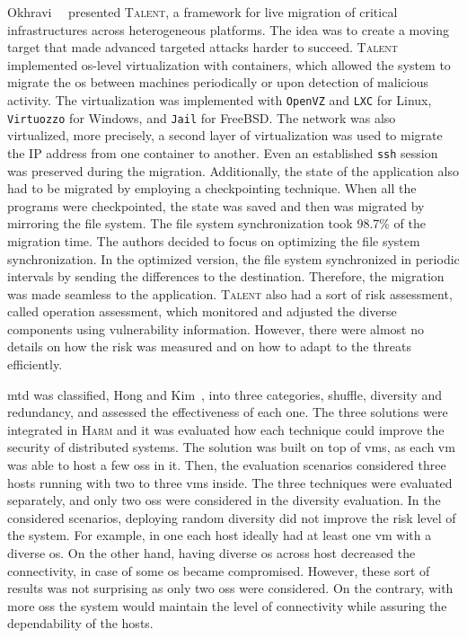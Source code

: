 Okhravi~\etal{}~\cite{Okhravi:2014} presented \textsc{Talent}, a framework for live migration of critical infrastructures across heterogeneous platforms.
The idea was to create a moving target that made advanced targeted attacks harder to succeed. 
\textsc{Talent} implemented \gls{os}-level virtualization with containers, which allowed the system to migrate the \gls{os} between machines periodically or upon detection of malicious activity. 
The virtualization was implemented with \texttt{OpenVZ} and \texttt{LXC} for Linux, \texttt{Virtuozzo} for Windows, and \texttt{Jail} for FreeBSD. 
The network was also virtualized, more precisely, a second layer of virtualization was used to migrate the IP address from one container to another. 
Even an established \texttt{ssh} session was preserved during the migration. 
Additionally, the state of the application also had to be migrated by employing a checkpointing technique. 
When all the programs were checkpointed, the state was saved and then was migrated by mirroring the file system. 
The file system synchronization took 98.7\% of the migration time. 
The authors decided to focus on optimizing the file system synchronization. 
In the optimized version, the file system synchronized in periodic intervals by sending the differences to the destination. 
Therefore, the migration was made seamless to the application. 
\textsc{Talent} also had a sort of risk assessment, called operation assessment, which monitored and adjusted the diverse components using vulnerability information. 
However, there were almost no details on how the risk was measured and on how to adapt to the threats efficiently.


\gls{mtd} was classified, Hong and Kim~\cite{Hong:2015}, into three categories, shuffle, diversity and redundancy, and assessed the effectiveness of each one.
The three solutions were integrated in \textsc{Harm} and it was evaluated how each technique could improve the security of distributed systems.
The solution was built on top of \glspl{vm}, as each \gls{vm} was able to host a few \glspl{os} in it.
Then, the evaluation scenarios considered three hosts running with two to three \glspl{vm} inside.
The three techniques were evaluated separately, and only two \glspl{os} were considered in the diversity evaluation.
In the considered scenarios, deploying random diversity did not improve the risk level of the system. 
For example, in one each host ideally had at least one \gls{vm} with a diverse \gls{os}.
On the other hand, having diverse \gls{os} across host decreased the connectivity, in case of some \gls{os} became compromised.
However, these sort of results was not surprising as only two \glspl{os} were considered.
On the contrary, with more \glspl{os} the system would maintain the level of connectivity while assuring the dependability of the hosts.
 

